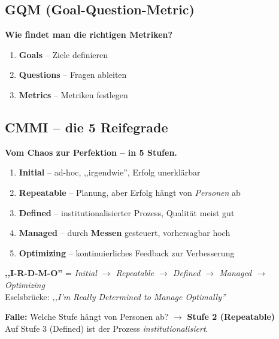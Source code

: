 \documentclass[11pt,a4paper]{article}
\begin{document}
\subsection{GQM (Goal-Question-Metric)}

\begin{keyfacts}
\textbf{Wie findet man die richtigen Metriken?}
\begin{enumerate}
  \item \textbf{Goals} -- Ziele definieren
  \item \textbf{Questions} -- Fragen ableiten
  \item \textbf{Metrics} -- Metriken festlegen
\end{enumerate}
\end{keyfacts}

\subsection{CMMI -- die 5 Reifegrade}

\begin{story}
\textbf{Vom Chaos zur Perfektion -- in 5 Stufen.}
\end{story}

\begin{keyfacts}
\begin{enumerate}
  \item \textbf{Initial} -- ad-hoc, ,,irgendwie'', Erfolg unerklärbar
  \item \textbf{Repeatable} -- Planung, aber Erfolg hängt von \emph{Personen} ab
  \item \textbf{Defined} -- institutionalisierter Prozess, Qualität meist gut
  \item \textbf{Managed} -- durch \textbf{Messen} gesteuert, vorhersagbar hoch
  \item \textbf{Optimizing} -- kontinuierliches Feedback zur Verbesserung
\end{enumerate}
\end{keyfacts}

\begin{merkhilfe}
\textbf{,,I-R-D-M-O''} = \emph{Initial $\rightarrow$ Repeatable $\rightarrow$ Defined $\rightarrow$ Managed $\rightarrow$ Optimizing}\\
Eselsbrücke: \emph{,,I'm Really Determined to Manage Optimally''}
\end{merkhilfe}

\begin{trap}
\textbf{Falle:} Welche Stufe hängt von Personen ab? $\rightarrow$ \textbf{Stufe 2 (Repeatable)}\\
Auf Stufe 3 (Defined) ist der Prozess \emph{institutionalisiert}.
\end{trap}
\end{document}
